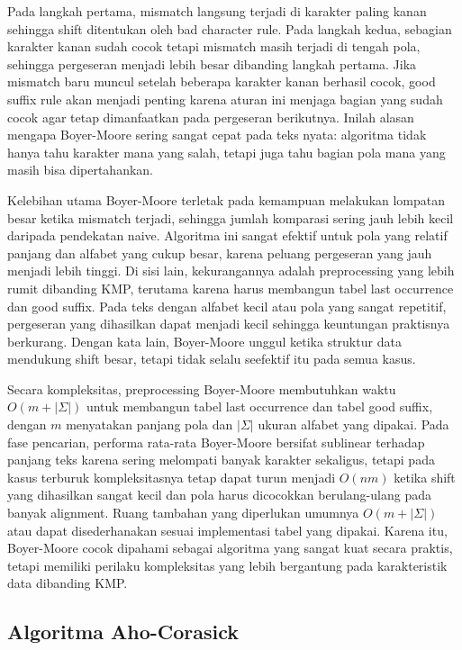 Pada langkah pertama, mismatch langsung terjadi di karakter paling kanan sehingga shift ditentukan oleh bad character rule. Pada langkah kedua, sebagian karakter kanan sudah cocok tetapi mismatch masih terjadi di tengah pola, sehingga pergeseran menjadi lebih besar dibanding langkah pertama. Jika mismatch baru muncul setelah beberapa karakter kanan berhasil cocok, good suffix rule akan menjadi penting karena aturan ini menjaga bagian yang sudah cocok agar tetap dimanfaatkan pada pergeseran berikutnya. Inilah alasan mengapa Boyer-Moore sering sangat cepat pada teks nyata: algoritma tidak hanya tahu karakter mana yang salah, tetapi juga tahu bagian pola mana yang masih bisa dipertahankan.

Kelebihan utama Boyer-Moore terletak pada kemampuan melakukan lompatan besar ketika mismatch terjadi, sehingga jumlah komparasi sering jauh lebih kecil daripada pendekatan naive. Algoritma ini sangat efektif untuk pola yang relatif panjang dan alfabet yang cukup besar, karena peluang pergeseran yang jauh menjadi lebih tinggi. Di sisi lain, kekurangannya adalah preprocessing yang lebih rumit dibanding KMP, terutama karena harus membangun tabel last occurrence dan good suffix. Pada teks dengan alfabet kecil atau pola yang sangat repetitif, pergeseran yang dihasilkan dapat menjadi kecil sehingga keuntungan praktisnya berkurang. Dengan kata lain, Boyer-Moore unggul ketika struktur data mendukung shift besar, tetapi tidak selalu seefektif itu pada semua kasus.

Secara kompleksitas, preprocessing Boyer-Moore membutuhkan waktu $O(m + |\Sigma|)$ untuk membangun tabel last occurrence dan tabel good suffix, dengan $m$ menyatakan panjang pola dan $|\Sigma|$ ukuran alfabet yang dipakai. Pada fase pencarian, performa rata-rata Boyer-Moore bersifat sublinear terhadap panjang teks karena sering melompati banyak karakter sekaligus, tetapi pada kasus terburuk kompleksitasnya tetap dapat turun menjadi $O(nm)$ ketika shift yang dihasilkan sangat kecil dan pola harus dicocokkan berulang-ulang pada banyak alignment. Ruang tambahan yang diperlukan umumnya $O(m + |\Sigma|)$ atau dapat disederhanakan sesuai implementasi tabel yang dipakai. Karena itu, Boyer-Moore cocok dipahami sebagai algoritma yang sangat kuat secara praktis, tetapi memiliki perilaku kompleksitas yang lebih bergantung pada karakteristik data dibanding KMP.


\subsection{Algoritma Aho-Corasick}

